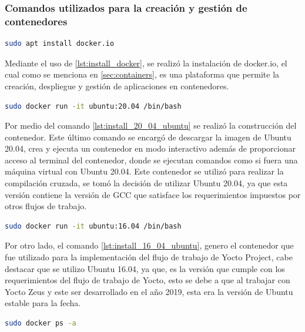 \subsubsection{Comandos utilizados para la creación y gestión de contenedores}\label{subsec:manejo_de_contenedores}


\begin{lstlisting}[language=bash, caption={Instalacion de docker, Linux}, label=lst:install_docker]
    sudo apt install docker.io
\end{lstlisting}

Mediante el uso de \ref{lst:install_docker}, se realizó la instalación de docker.io, el cual como se menciona en \ref{sec:containers}, es una plataforma que permite la creación, despliegue y gestión de aplicaciones en contenedores. 

\begin{lstlisting}[language=bash, caption={Instalacion de Ubuntu 20.04, Linux}, label=lst:install_20_04_ubuntu]
    sudo docker run -it ubuntu:20.04 /bin/bash
\end{lstlisting}

Por medio del comando \ref{lst:install_20_04_ubuntu} se realizó la construcción del contenedor. Este último comando se encargó de descargar la imagen de Ubuntu 20.04, crea y ejecuta un contenedor en modo interactivo además de proporcionar acceso al terminal del contenedor, donde se ejecutan comandos como si fuera una máquina virtual con Ubuntu 20.04. Este contenedor se utilizó para realizar la compilación cruzada, se tomó la decisión de utilizar Ubuntu 20.04, ya que esta versión contiene la versión de GCC que satisface los requerimientos impuestos por otros flujos de trabajo.

\begin{lstlisting}[language=bash, caption={Instalacion de Ubuntu 16.04, Linux}, label=lst:install_16_04_ubuntu]
    sudo docker run -it ubuntu:16.04 /bin/bash
\end{lstlisting}

Por otro lado, el comando \ref{lst:install_16_04_ubuntu}, genero el contenedor que fue utilizado para la implementación del flujo de trabajo de Yocto Project, cabe destacar que se utilizo Ubuntu 16.04, ya que, es la versión que cumple con los requerimientos del flujo de trabajo de Yocto, esto se debe a que al trabajar con Yocto Zeus y este ser desarrollado en el año 2019, esta era la versión de Ubuntu estable para la fecha. 

\begin{lstlisting}[language=bash, caption={Lista de contenedores del sistema, Docker}, label=lst:docker_basics_ps-a]
    sudo docker ps -a
\end{lstlisting}

